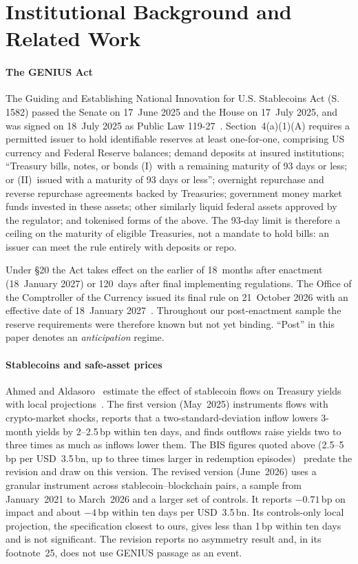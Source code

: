 \section{Institutional Background and Related Work}\label{sec:background}

\paragraph*{The GENIUS Act} The Guiding and Establishing National Innovation for U.S. Stablecoins Act (S.\,1582) passed the Senate on 17~June 2025 and the House on 17~July 2025, and was signed on 18~July 2025 as Public Law 119-27~\cite{genius2025}. Section~4(a)(1)(A) requires a permitted issuer to hold identifiable reserves at least one-for-one, comprising US currency and Federal Reserve balances; demand deposits at insured institutions; ``Treasury bills, notes, or bonds (I)~with a remaining maturity of 93 days or less; or (II)~issued with a maturity of 93 days or less''; overnight repurchase and reverse repurchase agreements backed by Treasuries; government money market funds invested in these assets; other similarly liquid federal assets approved by the regulator; and tokenised forms of the above. The 93-day limit is therefore a ceiling on the maturity of eligible Treasuries, not a mandate to hold bills: an issuer can meet the rule entirely with deposits or repo.

Under \S20 the Act takes effect on the earlier of 18~months after enactment (18~January 2027) or 120~days after final implementing regulations. The Office of the Comptroller of the Currency issued its final rule on 21~October 2026 with an effective date of 18~January 2027~\cite{occ2026}. Throughout our post-enactment sample the reserve requirements were therefore known but not yet binding. ``Post'' in this paper denotes an \emph{anticipation} regime.

\paragraph*{Stablecoins and safe-asset prices} Ahmed and Aldasoro~\cite{ahmed2025} estimate the effect of stablecoin flows on Treasury yields with local projections~\cite{jorda2005}. The first version (May~2025) instruments flows with crypto-market shocks, reports that a two-standard-deviation inflow lowers 3-month yields by 2--2.5\,bp within ten days, and finds outflows raise yields two to three times as much as inflows lower them. The BIS figures quoted above (2.5--5\,bp per USD~3.5\,bn, up to three times larger in redemption episodes)~\cite{bis2025aer} predate the revision and draw on this version. The revised version (June~2026) uses a granular instrument across stablecoin--blockchain pairs, a sample from January~2021 to March~2026 and a larger set of controls. It reports $-0.71$\,bp on impact and about $-4$\,bp within ten days per USD~3.5\,bn. Its controls-only local projection, the specification closest to ours, gives less than 1\,bp within ten days and is not significant. The revision reports no asymmetry result and, in its footnote~25, does not use GENIUS passage as an event.

